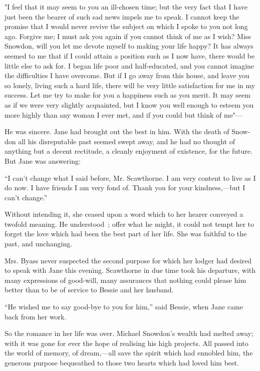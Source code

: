 "I feel that it may seem to you an ill-chosen time; but the very fact
that I have just been the bearer of such sad news impels me to speak. I
cannot keep the promise that I would never revive the subject on which I
spoke to you not long ago. Forgive me; I must ask you again if you
cannot think of me as I wish? Miss Snowdon, will you let me devote
myself to making your life happy? It has always seemed to me that if I
could attain a position such as I now have, there would be little else
to ask for. I began life poor and half-educated, and you cannot imagine
the difficulties I have overcome. But if I go away from this house, and
leave you so lonely, living such a hard life, there will be very {}
little satisfaction for me in my success. Let me try to make for you a
happiness such as you merit. It may seem as if we were very slightly
acquainted, but I know you well enough to esteem you more highly than
any woman I ever met, and if you could but think of me"---

He was sincere. Jane had brought out the best in him. With the death of
Snow- don all his disreputable past seemed swept away, and he had no
thought of anything but a decent rectitude, a cleanly enjoyment of
existence, for the future. But Jane was answering:

``I can't change what I said before, Mr. Scawthorne. I am very content
to live as I do now. I have friends I am very fond of. Thank you for
your kindness,---but I can't change.''

Without intending it, she ceased upon a word which to her hearer
conveyed a twofold meaning. He understood~; offer what he might, it
could not tempt her to forget the love which had been the best part of
her life. She was faithful to the past, and unchanging.

Mrs. Byass never suspected the second purpose for which her lodger had
desired to speak {} with Jane this evening. Scawthorne in due time took
his departure, with many expressions of good-will, many assurances that
nothing could please him better than to be of service to Bessie and her
husband.

``He wished me to say good-bye to you for him,'' said Bessie, when Jane
came back from her work.

So the romance in her life was over. Michael Snowdon's wealth had melted
away; with it was gone for ever the hope of realising his high projects.
All passed into the world of memory, of dream,---all save the spirit
which had ennobled him, the generous purpose bequeathed to those two
hearts which had loved him best.

